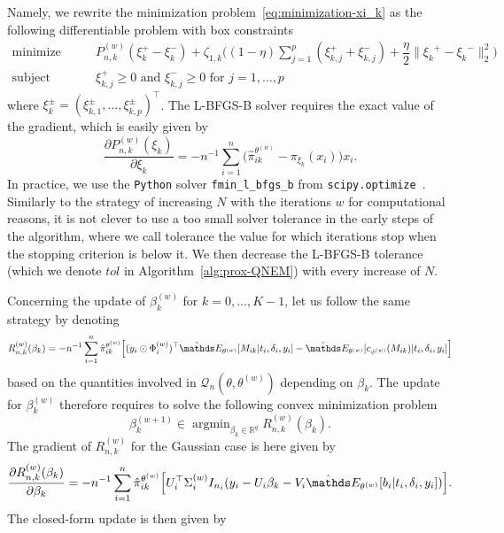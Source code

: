 \documentclass[11pt]{article}
\DeclareMathOperator{\argmin}{argmin}
\newcommand{\norm}[1]{\|#1\|}
\newcommand{\cQ}{\mathcal Q}
\newcommand{\R}{\mathds R}
\newcommand{\E}{\mathds E}
\begin{document}
Namely, we rewrite the minimization problem~\eqref{eq:minimization-xi_k} as the following differentiable problem with box constraints
\begin{equation}
  \label{eq:sub-problem-xi_k}
  \begin{split}
    \text{minimize}& \quad \quad P_{n, k}^{(w)}(\xi_k^+ - \xi_k^-) + \zeta_{1,k} \big((1 - \eta) \sum_{j=1}^p (\xi_{k,j}^+ + \xi_{k,j}^-) + \dfrac \eta 2 \norm{{\xi_k}^+ - {\xi_k}^-}_2^2 \big) \\
    \text{subject to}& \quad \quad \xi_{k,j}^+ \geq 0 \text{ and } \xi_{k,j}^- \geq 0 \text{ for } j = 1, \ldots, p
  \end{split} 
\end{equation}
where $\xi_k^\pm = (\xi_{k,1}^\pm, \ldots, \xi_{k,p}^\pm)^\top$. The L-BFGS-B solver requires the exact value of the gradient, which is easily given by
\begin{equation}
  \label{eq:grad-xi_k}
  \frac{\partial P_{n,k}^{(w)}(\xi_k)}{\partial \xi_k} = -n^{-1} \sum_{i=1}^n  \big( \hat \pi_{ik}^{\theta^{(w)}} - \pi_{\xi_k}(x_i) \big) x_i.
\end{equation}
In practice, we use the \texttt{Python} solver \texttt{fmin\_l\_bfgs\_b} from \texttt{scipy.optimize}~\citep{virtanen2020scipy}. Similarly to the strategy of increasing $N$ with the iterations $w$ for computational reasons, it is not clever to use a too small solver tolerance in the early steps of the algorithm, where we call tolerance the value for which iterations stop when the stopping criterion is below it. We then decrease the L-BFGS-B tolerance (which we denote $tol$ in Algorithm~\ref{alg:prox-QNEM}) with every increase of $N$.

Concerning the update of $\beta_k^{(w)}$ for $k=0, \ldots, K-1$, let us follow the same strategy by denoting
\begin{equation*}
  R^{(w)}_{n,k}(\beta_k) = -n^{-1} \sum_{i=1}^n \hat \pi_{ik}^{\theta^{(w)}} \Big[ (y_i \odot \Phi_i^{(w)})^\top \hat \E_{\theta^{(w)}}[ M_{ik} | t_i, \delta_i, y_i] - \hat \E_{\theta^{(w)}}[ c_{\phi^{(w)}}(M_{ik}) | t_i, \delta_i, y_i] \Big]
\end{equation*}
based on the quantities involved in $\cQ_n(\theta, \theta^{(w)})$ depending on $\beta_k$. The update for $\beta_k^{(w)}$ therefore requires to solve the following convex minimization problem
\begin{equation}
  \label{eq:minimization-beta_k}
  \beta_k^{(w+1)} \in \argmin_{\beta_k \in \R^q} R^{(w)}_{n,k}(\beta_k).
\end{equation}
The gradient of $R_{n,k}^{(w)}$ for the Gaussian case is here given by
\begin{equation}
  \label{eq:grad-beta_k}
  \frac{\partial R_{n,k}^{(w)}(\beta_k)}{\partial \beta_k} = -n^{-1} \sum_{i=1}^n \hat \pi_{ik}^{\theta^{(w)}} \Big[ U_{i}^\top \Sigma_i^{(w)} I_{n_{i}} (y_i - U_{i}\beta_k - V_{i}\hat \E_{\theta^{(w)}}[ b_i | t_i, \delta_i, y_i])\Big].
\end{equation}
The closed-form update is then given by
\end{document}
